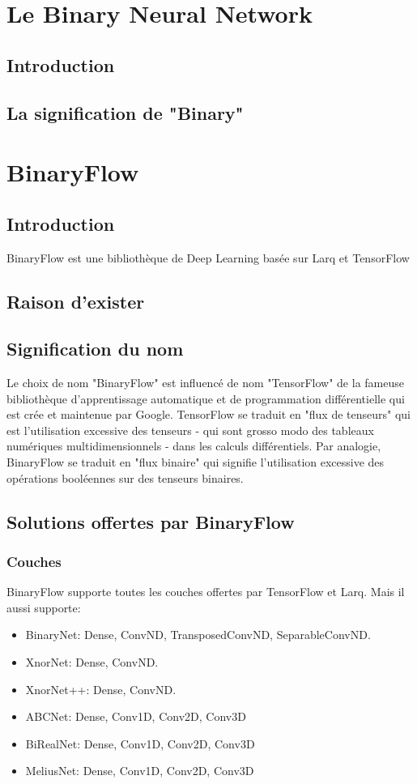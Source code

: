 \section{Le Binary Neural Network}
\subsection{Introduction}
\subsection{La signification de "Binary"}
\newpage 
\section{BinaryFlow}
\subsection{Introduction}
BinaryFlow est une bibliothèque de Deep Learning basée sur Larq et TensorFlow
\subsection{Raison d'exister}
\subsection{Signification du nom}
Le choix de nom "BinaryFlow" est influencé de nom "TensorFlow" de la fameuse bibliothèque d'apprentissage automatique et de programmation différentielle qui est crée et maintenue par Google.
\newline TensorFlow se traduit en "flux de tenseurs" qui est l'utilisation excessive  des tenseurs - qui sont grosso modo des tableaux numériques multidimensionnels - dans les calculs différentiels.
\newline Par analogie, BinaryFlow se traduit en "flux binaire" qui signifie l'utilisation excessive des opérations booléennes sur des tenseurs binaires.
\subsection{Solutions offertes par BinaryFlow}
\subsubsection{Couches}
BinaryFlow supporte toutes les couches offertes par TensorFlow et Larq. Mais il aussi supporte:
\begin{itemize}
	\item BinaryNet: Dense, ConvND, TransposedConvND, SeparableConvND.
	\item XnorNet: Dense, ConvND.
	\item XnorNet++: Dense, ConvND.
	\item ABCNet: Dense, Conv1D, Conv2D, Conv3D
	\item BiRealNet: Dense, Conv1D, Conv2D, Conv3D
	\item MeliusNet: Dense, Conv1D, Conv2D, Conv3D
\end{itemize}
